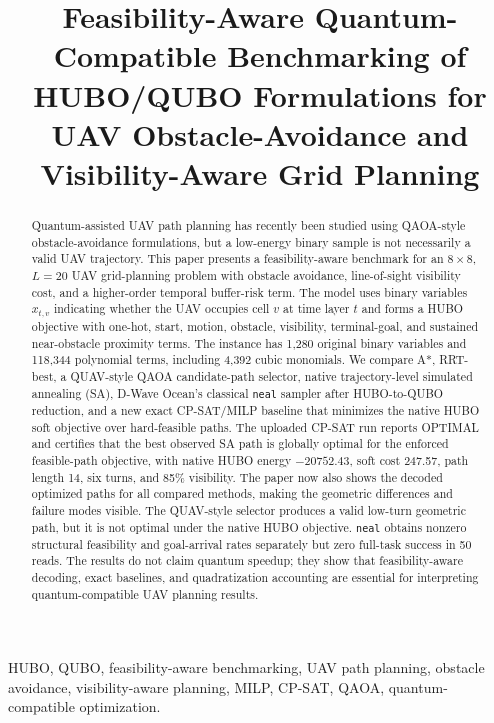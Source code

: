 \documentclass[10pt,conference]{IEEEtran}
\title{Feasibility-Aware Quantum-Compatible Benchmarking of HUBO/QUBO Formulations for UAV Obstacle-Avoidance and Visibility-Aware Grid Planning}
\author{\IEEEauthorblockN{Author names to be finalized}
\IEEEauthorblockA{Affiliations to be finalized\\
Email: to be finalized}}
\begin{document}
\maketitle

\begin{abstract}
Quantum-assisted UAV path planning has recently been studied using QAOA-style obstacle-avoidance formulations, but a low-energy binary sample is not necessarily a valid UAV trajectory. This paper presents a feasibility-aware benchmark for an $8\times8$, $L=20$ UAV grid-planning problem with obstacle avoidance, line-of-sight visibility cost, and a higher-order temporal buffer-risk term. The model uses binary variables $x_{t,v}$ indicating whether the UAV occupies cell $v$ at time layer $t$ and forms a HUBO objective with one-hot, start, motion, obstacle, visibility, terminal-goal, and sustained near-obstacle proximity terms. The instance has 1,280 original binary variables and 118,344 polynomial terms, including 4,392 cubic monomials. We compare A*, RRT-best, a QUAV-style QAOA candidate-path selector, native trajectory-level simulated annealing (SA), D-Wave Ocean's classical \texttt{neal} sampler after HUBO-to-QUBO reduction, and a new exact CP-SAT/MILP baseline that minimizes the native HUBO soft objective over hard-feasible paths. The uploaded CP-SAT run reports OPTIMAL and certifies that the best observed SA path is globally optimal for the enforced feasible-path objective, with native HUBO energy $-20752.43$, soft cost 247.57, path length 14, six turns, and 85\% visibility. The paper now also shows the decoded optimized paths for all compared methods, making the geometric differences and failure modes visible. The QUAV-style selector produces a valid low-turn geometric path, but it is not optimal under the native HUBO objective. \texttt{neal} obtains nonzero structural feasibility and goal-arrival rates separately but zero full-task success in 50 reads. The results do not claim quantum speedup; they show that feasibility-aware decoding, exact baselines, and quadratization accounting are essential for interpreting quantum-compatible UAV planning results.
\end{abstract}

\begin{IEEEkeywords}
HUBO, QUBO, feasibility-aware benchmarking, UAV path planning, obstacle avoidance, visibility-aware planning, MILP, CP-SAT, QAOA, quantum-compatible optimization.
\end{IEEEkeywords}
\end{document}
